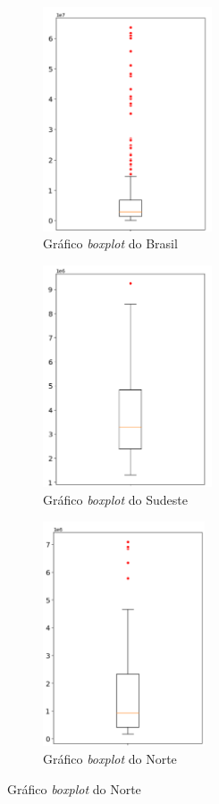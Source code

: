 \begin{figure}[H]
    \centering
    \label{fig:boxplot_all}
    \begin{subfigure}{5 cm}
        \centering
        \includegraphics[width=5cm]{../figuras/graficos/boxplot-pib-cc.png}
        \caption{Gráfico \textit{boxplot} do Brasil}
    \end{subfigure}
    \hfill
    \begin{subfigure}{5cm}
        \centering
        \includegraphics[width=5cm]{../figuras/graficos/boxplot-pib-cc-se.png}
        \caption{Gráfico \textit{boxplot} do Sudeste}
    \end{subfigure}
    \hfill
    \begin{subfigure}{5cm}
        \centering
        \includegraphics[width=4.8cm]{../figuras/graficos/boxplot-pib-cc-n.png}
        \caption{Gráfico \textit{boxplot} do Norte}
    \end{subfigure}
\end{figure}

